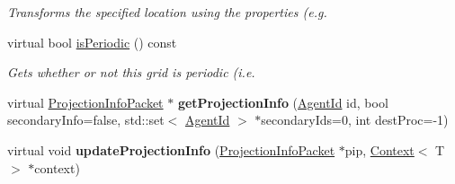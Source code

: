 \begin{DoxyCompactItemize}
\begin{DoxyCompactList}\small\item\em Transforms the specified location using the properties (e.\-g. \end{DoxyCompactList}\item 
virtual bool \hyperlink{classrepast_1_1_base_grid_a4dd5ec33acc952ab136f5e2b9886771e}{is\-Periodic} () const 
\begin{DoxyCompactList}\small\item\em Gets whether or not this grid is periodic (i.\-e. \end{DoxyCompactList}\item 
\hypertarget{classrepast_1_1_base_grid_a51685b60fcfb3081007b22559225af8f}{virtual \hyperlink{classrepast_1_1_projection_info_packet}{Projection\-Info\-Packet} $\ast$ {\bfseries get\-Projection\-Info} (\hyperlink{classrepast_1_1_agent_id}{Agent\-Id} id, bool secondary\-Info=false, std\-::set$<$ \hyperlink{classrepast_1_1_agent_id}{Agent\-Id} $>$ $\ast$secondary\-Ids=0, int dest\-Proc=-\/1)}\label{classrepast_1_1_base_grid_a51685b60fcfb3081007b22559225af8f}

\item 
\hypertarget{classrepast_1_1_base_grid_ac95c2c141f8b8365472c2f47df614554}{virtual void {\bfseries update\-Projection\-Info} (\hyperlink{classrepast_1_1_projection_info_packet}{Projection\-Info\-Packet} $\ast$pip, \hyperlink{classrepast_1_1_context}{Context}$<$ T $>$ $\ast$context)}\label{classrepast_1_1_base_grid_ac95c2c141f8b8365472c2f47df614554}


\end{DoxyCompactItemize}

